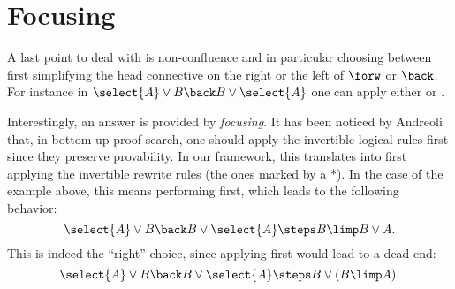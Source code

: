 

\section{Focusing}


A last point to deal with is non-confluence and in particular choosing
between first simplifying the head connective on the right or the left
of $\forw$ or $\back$. For instance in
$\select{A}\lor B \back B\lor\select{A}$ one can apply either
 or .

Interestingly, an answer is provided by {\em focusing}. It has been noticed by
Andreoli~ that, in bottom-up proof search, one should
apply the invertible logical rules first since they preserve provability. In our
framework, this translates into first applying the invertible rewrite rules (the
ones marked by a *). In the case of the example above, this means
performing  first, which leads to the following behavior:
$$\select{A}\lor B \back B\lor\select{A}\steps B\limp B\lor A.$$
This is indeed the ``right'' choice, since applying  first would
lead to a dead-end:
$$\select{A}\lor B \back B\lor\select{A}\steps B\lor(B\limp A).$$

